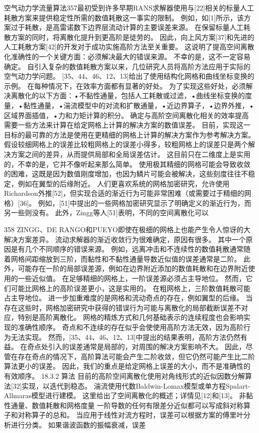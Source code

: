 \documentclass[UTF8,11pt,a4paper,openany,fontset=fandol]{ctexbook}
\begin{document}
空气动力学流量算法357最初受到许多早期RANS求解器使用与[22]相关的标量人工耗散方案来提供稳定性所需的数值耗散这一事实的限制。 例如，如[1]所示，该方案过于耗散，是高雷诺数下边界层流动计算的主要误差来源。 在保留标量人工耗散方案的同时，将离散化提升到更高阶是徒劳的。 因此，向上风方案[37]和先进的人工耗散方案[42]的开发对于成功实施高阶方法至关重要。 这说明了提高空间离散化准确性的一个关键方面：必须解决最大的错误来源。 不幸的是，这不一定容易确定。 自引入复杂的数值耗散方案以来，几位研究人员将高阶方法应用于实际的空气动力学问题。 [35、44、46、12、13]给出了使用结构化网格和曲线坐标变换的示例。 在每种情况下，在效率方面都有显著的好处。 为了实现这些好处，必须解决离散化的以下方面：•不黏性通量，包括人工耗散或过滤，•曲线坐标变换的度量，•黏性通量，•湍流模型中的对流和扩散通量，•近边界算子，•边界外推，•区域界面插值，•力和力矩计算的积分。 确定与高阶空间离散化相关的效率提高需要一些方法来计算在给定网格上计算的解决方案的数值误差。 目前，实现这一目标的最可靠的方法是使用在更精细的网格上计算的解决方案作为参考解决方案。 假设较细网格上的误差比较粗网格上的误差小得多，较粗网格上的误差只是两个解决方案之间的差异，从而提供局部和全局误差估计。 这目前只在二维度上是实用的，不幸的是，它并不像听起来那么简单。 使用极其精细的网格可能会导致收敛的困难，这既是因为数值刚度增加，也因为鳞片可能会被解决，这些刻度往往不稳定，例如在翼型的后缘附近。 人们更喜欢系统的网格加密研究，允许使用Richardson外推[52]，但实现合适的渐近行为可能非常困难（或需要过于精细的网格）[36]。 例如，[51]中提出的一些网格加密研究显示了明确定义的渐近行为，而另一些则没有。 此外，Zingg等人[51]表明，不同的空间离散化可以

358 ZINGG、DE RANGO和PUEYO即使在极细的网格上也能产生令人惊讶的大解决方案差异。 流动求解器的渐近收敛行为很难确定，原因有很多。 其中一个原因是有几个不同顺序的错误来源。 例如，远离冲击和不连续性的数值耗散通常随着网格间距缩放到三阶，而黏性和不黏性通量导数近似值的误差通常是二阶。 此外，可能存在一阶的局部误差源，例如在边界附近添加的数值耗散和在边界附近使用的一些近似值。 在足够精细的网格上，一阶误差源必须占主导地位。 然而，它们可能比网格上的高阶误差更小，这是实用的。 在粗网格上，三阶数值耗散可能占主导地位。 进一步加重难度的是网格和流动奇点的存在，例如翼型的后缘。 当存在这些时，网格加密研究中获得的错误行为可能与离散化的局部截断误差不对应，特别是高阶离散化。 网格的精炼方式和几何基础表示的连续程度也会影响实现的准确性顺序。 奇点和不连续的存在似乎会使使用高阶方法无效，因为高阶行为无法实现。 然而，[35、44、46、12、13]中提出的结果表明，高阶方法仍然有益。 在奇点处引入的误差通常是局部的，对周围的解决方案影响不大。 因此，尽管在存在奇点的情况下，高阶算法可能会产生二阶收敛，但它仍然可能产生比二阶算法更小的误差。 因此，我们的重点是给定网格上误差的大小，而不是准确性的有效顺序。 18.3.2 算法 目前的高阶空间离散化使用对角线形式的近似因数分解算法[32]实现，以迭代到稳态。 湍流使用代数Baldwin-Lomax模型或单方程Spalart-Allmaras模型进行建模。 这里给出了空间离散化的概述；详情见[12]和[13]。 非黏性通量、数值耗散和网格度量 一阶导数的任何有限差分近似都可以写成斜对称算子和对称算子的总和。 当应用于线性对流方程时，误差可以根据方案的傅里叶分析进行分类。 如果谐波函数的振幅衰减，误差
\end{document}
